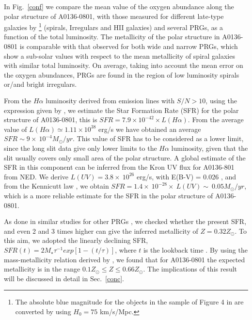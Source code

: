 \documentclass[useAMS,usenatbib]{mn2e}
\begin{document}
In Fig.~\ref{conf} we compare the mean value of the oxygen abundance
along the polar structure of A0136-0801, with those measured for
different late-type galaxies by \cite{Kob99}\footnote{The absolute
  blue magnitude for the objects in the sample of Figure 4 in
  \citet{Kob99} are converted by using $H_{0} =75$ km/s/Mpc.}
(spirals, Irregulars and HII galaxies) and several PRGs, as a function
of the total luminosity.  The metallicity of the polar structure in
A0136-0801 is comparable with that observed for both wide and narrow
PRGs, which show a sub-solar values with respect to the mean
metallicity of spiral galaxies with similar total luminosity. On
average, taking into account the mean error on the oxygen abundances,
PRGs are found in the region of low luminosity spirals or/and bright
irregulars.

From the $H \alpha$ luminosity derived from emission lines with $S/N >
10$, using the expression given by \cite{Ken98}, we estimate the Star
Formation Rate (SFR) for the polar structure of A0136-0801, this is
$SFR = 7.9 \times 10^{-42} \times L(H \alpha)$. From the average value
of $L(H \alpha) \simeq 1.11 \times 10^{38}$ erg/s we have obtained an
average $SFR \sim 9 \times\ 10^{-4} M_{\odot}/yr$. This value of
  SFR has to be considered as a lower limit, since the long slit data
  give only lower limits to the $H \alpha$ luminosity, given that the
  slit usually covers only small area of the polar structure. A global
  estimate of the SFR in this component can be inferred from the Kron
  UV flux for A0136-801 from NED. We derive $L(UV)=3.8
  \times\ 10^{26}$ erg/s, with E(B-V) = 0.026 \citep{Seibert12}, and from the Kennicutt law \citep{Ken98}, we
  obtain $SFR = 1.4 \times\ 10^{-28} \times\ L (UV) \sim\ 0.05
  M_{\odot}/yr$, which is a more reliable estimate for the SFR in the
  polar structure of A0136-0801.

As done in similar studies for other PRGs \citep{Spav10,Spav11,Spav13}, we checked whether the present SFR, 
and even 2 and 3 times higher can give the inferred metallicity of $Z=0.32 Z_{\odot}$. 
To this aim, we adopted the linearly declining SFR, 
$SFR(t) =2 M_{\star}\tau^{-1}exp[1-(t/\tau)]$, where $t$ is the lookback time \citep{Bru03}.
By using the mass-metallicity relation derived by \cite{Tre04}, we found that for A0136-0801
the expected metallicity is  in the range $0.1 Z_{\odot} \le Z \le
0.66 Z_{\odot}$. 
The implications of this result will be discussed in detail in Sec.~\ref{conc}.
\end{document}
